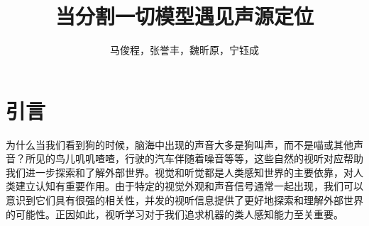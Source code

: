 \documentclass[12pt]{article}
\title{\textbf{当分割一切模型遇见声源定位}}
\author{马俊程，张誉丰，魏昕原，宁钰成}
\date{}
\begin{document}
	\maketitle
\section{引言}
为什么当我们看到狗的时候，脑海中出现的声音大多是狗叫声，而不是喵或其他声音？所见的鸟儿叽叽喳喳，行驶的汽车伴随着噪音等等，这些自然的视听对应帮助我们进一步探索和了解外部世界。视觉和听觉都是人类感知世界的主要依靠，对人类建立认知有重要作用。由于特定的视觉外观和声音信号通常一起出现，我们可以意识到它们具有很强的相关性，并发的视听信息提供了更好地探索和理解外部世界的可能性。正因如此，视听学习对于我们追求机器的类人感知能力至关重要。
\begin{figure}[!h]
  \centering
\end{figure}
\end{document}
